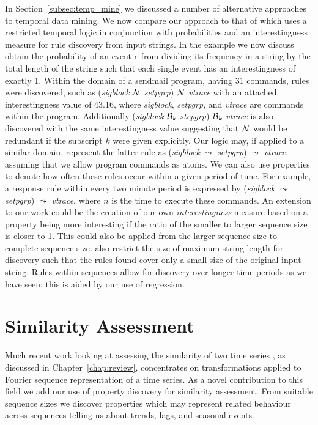 \medskip
In Section~\ref{subsec:temp_mine} we discussed a number of alternative
approaches to temporal data mining. We now compare our approach to
that of \cite{bt98} which uses a restricted temporal logic in conjunction with
probabilities and an interestingness measure for rule discovery from
input strings. In the example we 
now discuss \cite{bt98} obtain the probability of an event $e$ from
dividing its frequency in a string by the total length of the string
such that each {single} event has an interestingness of exactly 1.
Within the domain of a {\ttb sendmail\tte} program, having 31
commands, rules were discovered, such as ({\em sigblock} ${\cal N}$
{\em setpgrp}) ${\cal N}$ {\em vtrace} 
with an attached interestingness value of 43.16, where
{\em sigblock}, {\em setpgrp}, and {\em vtrace} are commands within the
program. Additionally ({\em sigblock} ${\cal B}_k$ {\em stepgrp}) ${\cal B}_k$
{\em vtrace} is also discovered with the same interestingness value
suggesting that $\cal N$ would be redundant if the subscript $k$ were
given explicitly. Our logic may, if applied to a similar domain,
represent the latter rule as ({\em sigblock} $\leadsto$ {\em setpgrp})
$\leadsto$ {\em vtrace}, assuming 
that we allow program commands as atoms. We can also
use properties to denote how often these rules occur within a
given period of time. For example, a response rule within every two
minute period is expressed by  ({\em sigblock} $\leadsto$
{\em setpgrp}) $\leadsto$ 
{\em vtrace}, where $n$ is the time to execute these commands. An extension
to our work could be the creation of our own {\em interestingness}
measure based on a property being more interesting if the ratio of the
smaller to larger sequence size is closer to 1. This could also be
applied from the larger sequence size to complete sequence size.
\cite{bt98}
also restrict the size of maximum string length for discovery such
that the rules found cover only a small size of the original input
string. Rules within sequences allow for discovery over longer time
periods as we have seen; this is aided by our use of regression.

\section{Similarity Assessment}\label{sec:tr_sim_ass}

Much recent work looking at assessing the similarity of two time
series \cite{alss95,frm94,dgm97,rm97}, as discussed in
Chapter~\ref{chap:review}, concentrates on transformations applied to
Fourier sequence representation of a time series.  As a novel
contribution to this field we add our use of property discovery for
similarity assessment. From suitable sequence sizes we
discover properties which may represent related behaviour across
sequences telling us about trends, lags, and seasonal events.

